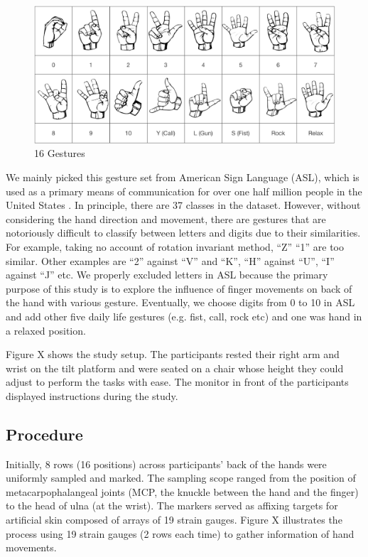\documentclass{sigchi}
\begin{document}
\begin{figure}
  \begin{center}
  \includegraphics[width=1\columnwidth]{figures/gestureSet_16_v2.pdf}
  \caption{
    16 Gestures
  }\label{fig:gestureSet16}
  \end{center}
\end{figure}

We mainly picked this gesture set from American Sign Language (ASL), which is used as a primary means of communication for over one half million people in the United States \cite{How_Many_People_Use_ASL}. 
In principle, there are 37 classes in the dataset. However, without considering the hand direction and movement, there are gestures that are notoriously difficult to classify between letters and digits due to their similarities.
For example, taking no account of rotation invariant method, ``Z'' ``1'' are too similar. 
Other examples are ``2'' against ``V'' and ``K'', ``H'' against ``U'', ``I'' against ``J'' etc.
We properly excluded letters in ASL because the primary purpose of this study is to explore the influence of finger movements on back of the hand with various gesture.
Eventually, we choose digits from 0 to 10 in ASL and add other five daily life gestures (e.g. fist, call, rock etc) and one was hand in a relaxed position.

Figure X shows the study setup. The participants rested their right arm and wrist on the tilt platform and were seated on a chair whose height they could adjust to perform the tasks with ease. The monitor in front of the participants displayed instructions during the study.

\subsection{Procedure}
Initially, 8 rows (16 positions) across participants’ back of the hands were uniformly sampled and marked. The sampling scope ranged from the position of metacarpophalangeal joints (MCP, the knuckle between the hand and the finger) to the head of ulna (at the wrist).%
The markers served as affixing targets for artificial skin composed of arrays of 19 strain gauges. 
Figure X illustrates the process using 19 strain gauges (2 rows each time) to gather information of hand movements.
\end{document}

